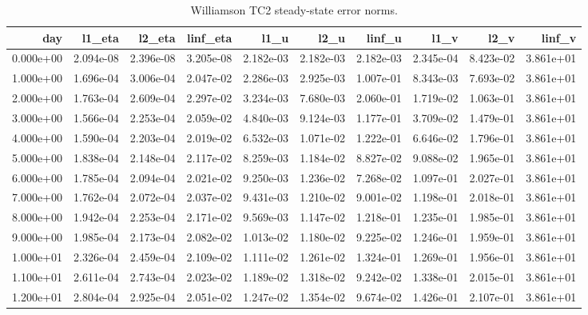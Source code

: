 \begin{table}[htbp]
\centering
{}
\begin{tabular}{rrrrrrrrrr}
\toprule
day & l1\_eta & l2\_eta & linf\_eta & l1\_u & l2\_u & linf\_u & l1\_v & l2\_v & linf\_v \\
\midrule
0.000e+00 & 2.094e-08 & 2.396e-08 & 3.205e-08 & 2.182e-03 & 2.182e-03 & 2.182e-03 & 2.345e-04 & 8.423e-02 & 3.861e+01 \\
1.000e+00 & 1.696e-04 & 3.006e-04 & 2.047e-02 & 2.286e-03 & 2.925e-03 & 1.007e-01 & 8.343e-03 & 7.693e-02 & 3.861e+01 \\
2.000e+00 & 1.763e-04 & 2.609e-04 & 2.297e-02 & 3.234e-03 & 7.680e-03 & 2.060e-01 & 1.719e-02 & 1.063e-01 & 3.861e+01 \\
3.000e+00 & 1.566e-04 & 2.253e-04 & 2.059e-02 & 4.840e-03 & 9.124e-03 & 1.177e-01 & 3.709e-02 & 1.479e-01 & 3.861e+01 \\
4.000e+00 & 1.590e-04 & 2.203e-04 & 2.019e-02 & 6.532e-03 & 1.071e-02 & 1.222e-01 & 6.646e-02 & 1.796e-01 & 3.861e+01 \\
5.000e+00 & 1.838e-04 & 2.148e-04 & 2.117e-02 & 8.259e-03 & 1.184e-02 & 8.827e-02 & 9.088e-02 & 1.965e-01 & 3.861e+01 \\
6.000e+00 & 1.785e-04 & 2.094e-04 & 2.021e-02 & 9.250e-03 & 1.236e-02 & 7.268e-02 & 1.097e-01 & 2.027e-01 & 3.861e+01 \\
7.000e+00 & 1.762e-04 & 2.072e-04 & 2.037e-02 & 9.431e-03 & 1.210e-02 & 9.001e-02 & 1.198e-01 & 2.018e-01 & 3.861e+01 \\
8.000e+00 & 1.942e-04 & 2.253e-04 & 2.171e-02 & 9.569e-03 & 1.147e-02 & 1.218e-01 & 1.235e-01 & 1.985e-01 & 3.861e+01 \\
9.000e+00 & 1.985e-04 & 2.173e-04 & 2.082e-02 & 1.013e-02 & 1.180e-02 & 9.225e-02 & 1.246e-01 & 1.959e-01 & 3.861e+01 \\
1.000e+01 & 2.326e-04 & 2.459e-04 & 2.109e-02 & 1.111e-02 & 1.261e-02 & 1.324e-01 & 1.269e-01 & 1.956e-01 & 3.861e+01 \\
1.100e+01 & 2.611e-04 & 2.743e-04 & 2.023e-02 & 1.189e-02 & 1.318e-02 & 9.242e-02 & 1.338e-01 & 2.015e-01 & 3.861e+01 \\
1.200e+01 & 2.804e-04 & 2.925e-04 & 2.051e-02 & 1.247e-02 & 1.354e-02 & 9.674e-02 & 1.426e-01 & 2.107e-01 & 3.861e+01 \\
\bottomrule
\end{tabular}
\caption{Williamson TC2 steady-state error norms.}
\end{table}
